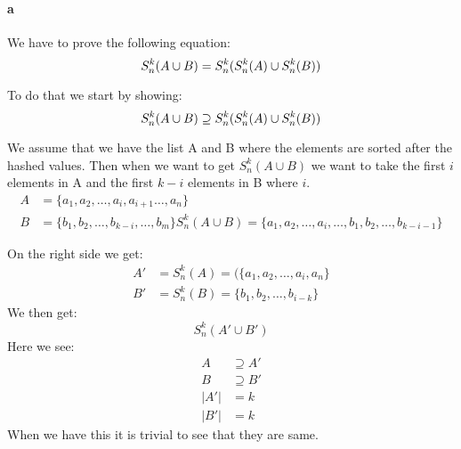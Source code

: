 \paragraph{a}
We have to prove the following equation:
\begin{equation}
    S^{k}_{n}(A \cup B) = S^{k}_{n}(S^{k}_{n}(A) \cup S^{k}_{n}(B))\\
\end{equation}

To do that we start by showing:
\begin{equation}
    S^{k}_{n}(A \cup B) \supseteq S^{k}_{n}(S^{k}_{n}(A) \cup S^{k}_{n}(B))\\
\end{equation}

We assume that we have the list A and B where the elements are sorted after the
hashed values. Then when we want to get $S^{k}_{n}(A\cup B)$ we want to take
the first $i$ elements in A and the first $k-i$ elements in B where $i$.
\begin{align*}
    A &=\{a_1, a_2, \dots , a_{i}, a_{i+1} \dots  , a_n\}\\
    B &=\{b_1, b_2, \dots , b_{k-i}, \dots , b_m\}
    S^{k}_{n}(A\cup B) =\{a_1, a_2, \dots , a_{i}, \dots,  b_1, b_2, \dots , b_{k-i-1}\}
\end{align*}

On the right side we get:
\begin{align*}
    A' &= S^{k}_{n}(A) = (\{a_1, a_2, \dots , a_{i}, a_{n}\}\\
    B' &= S^{k}_{n}(B) = \{b_1, b_2, \dots , b_{i-k}\}
\end{align*}
We then get:
\begin{equation*}
    S^{k}_{n}(A' \cup B')
\end{equation*}
Here we see:
\begin{align*}
    A &\supseteq A'\\
    B &\supseteq B'\\
    |A'| &= k\\
    |B'| &= k
\end{align*}
When we have this it is trivial to see that they are same.
